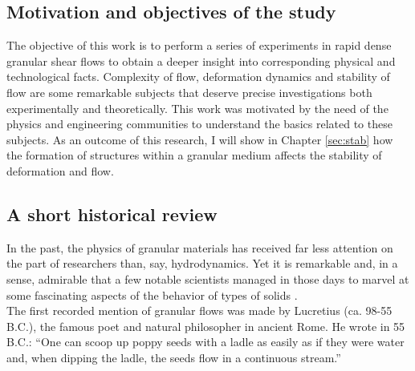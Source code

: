 \subsection{Motivation and objectives of the study}

The objective of this work is to perform a series of experiments
in rapid dense granular shear flows  to obtain a deeper insight
into corresponding physical and technological facts. Complexity of
flow, deformation dynamics and stability of flow are some
remarkable subjects that deserve precise investigations both
experimentally and theoretically. This work was motivated by the
need of the physics and engineering communities to understand the
basics related to these subjects. As an outcome of this research,
I will show in Chapter \ref{sec:stab} how the formation of
structures within a granular medium affects the stability of
deformation and flow.


%

\subsection{A short historical review}

In the past, the physics of granular materials has received far
less attention on the part of researchers than, say,
hydrodynamics. Yet it is remarkable and, in a sense, admirable
that a few notable scientists managed in those days to marvel at
some fascinating aspects of the behavior of types of solids
\citep{Dur00}.\\

The first recorded mention of granular flows was made by Lucretius
(ca. 98-55 B.C.), the famous poet and natural philosopher in
ancient Rome. He wrote in 55 B.C.: ``One can scoop up poppy seeds
with a ladle as easily as if they were water and, when dipping the
ladle, the seeds flow in a continuous stream.''\\

